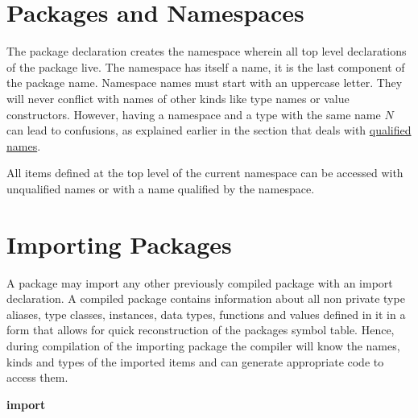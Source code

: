 \section{Packages and Namespaces}

The package declaration creates the namespace wherein all top level declarations 
of the package live. The namespace has itself a name,
it is the last component of the package name. Namespace names must start
with an uppercase letter. They will never conflict with names of other
kinds like type names or value constructors. 
However, having a namespace and a type with the same name $N$ can lead to confusions, as explained earlier in the section that deals with \hyperref[qualified names]{qualified names}.

All items defined at the top level of the current namespace can be
accessed with unqualified names or with a name qualified by the
namespace.


\section{Importing Packages} \label{import} 


A package may import any other previously compiled package with an import declaration.
A compiled package contains information about all non private type aliases, type classes, instances, 
data types, functions and values defined in it in a form that allows for quick reconstruction of the packages symbol table.
Hence, during compilation of the importing package the compiler will know the names, kinds and types of the imported items and can generate appropriate code to access them.

\begin{flushleft}
 \textbf{import}     {}\\
  \sym{(}  \sym{)} \\
   \\
  \oder{}    \oder{}  \oder{} 
  \oder{}   \oder{}  \\
  \oder {}   \oder {}  \\
 \sym{(}  \sym{)}\\
   \\
   \oder {}  \oder {}  \\
  \\
\end{flushleft}

